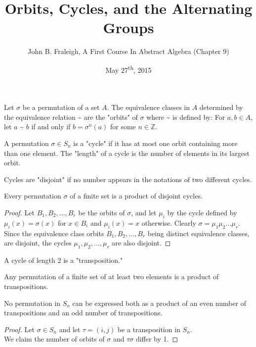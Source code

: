 \documentclass[a4paper,11pt]{article}
\title{Orbits, Cycles, and the Alternating Groups}
\author{John B. Fraleigh, A First Course In Abstract Algebra (Chapter 9)}
\date{May 27\textsuperscript{th}, 2015}
\begin{document}
\maketitle
{}

\begin{outline}

    Let \(\sigma\) be a permutation of a set \(A\). The equivalence classes 
    in \(A\) determined by the equivalence relation \textasciitilde{} are the "orbits" of \(\sigma\) where
    \textasciitilde{} is defined by: For \(a, b \in A\), let \(a\) \textasciitilde{} \(b\) if and only 
    if \(b = \sigma^{n}(a)\) for some \(n \in \mathbb{Z}\).
    
    A permutation \(\sigma \in S_{n}\) is a "cycle" if it has at most one orbit containing more than one 
    element. The "length" of a cycle is the number of elements in its largest orbit.
    
    Cycles are "disjoint" if no number appears in the notations of two different
    cycles.
    
    Every permutation \(\sigma\) of a finite set is a product of disjoint cycles.
    
    \begin{proof}
      Let \(B_{1}, B_{2}, \ldots, B_{r}\) be the orbits of \(\sigma\), and let \(\mu_{i}\) 
      by the cycle defined by \(\mu_{i}(x) = \sigma(x)\) for \(x \in B_{i}\) and \(\mu_{i}(x) = x\) otherwise.
      Clearly \(\sigma = \mu_{1}\mu_{2}\ldots\mu_{r}\). Since the equivalence class orbits \(B_{1}, B_{2}, \ldots,
      B_{r}\) being distinct equivalence classes, are disjoint, the cycles \(\mu_{1}, \mu_{2}, \ldots, \mu_{r}\) are
      also disjoint.
    \end{proof}
    
    A cycle of length 2 is a "transposition."
    
    Any permutation of a finite set of at least two elements is a product of transpositions.
    
    No permutation in \(S_{n}\) can be expressed both as a product of an even number of transpositions 
    and an odd number of transpositions.
    
    \begin{proof}
      Let \(\sigma \in S_{n}\) and let \(\tau = (i, j)\) be a transposition in \(S_{n}\).\\
      We claim the number of orbits of \(\sigma\) and \(\tau\sigma\) differ by 1.
      

\end{proof}
\end{outline}
\end{document}
